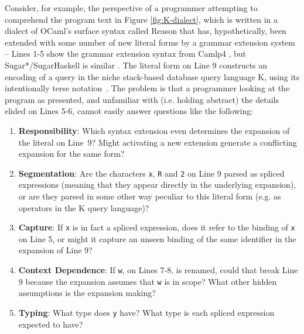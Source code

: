 \documentclass[acmsmall,review,anonymous]{acmart}\settopmatter{printfolios=true,printccs=false,printacmref=false}
\newcommand{\li}[1]{\lstinline[basicstyle=\ttfamily\fontsize{9pt}{1em}\selectfont]{#1}}
\begin{document}
Consider, for example, the perspective of a programmer attempting to comprehend the program text in Figure \ref{fig:K-dialect}, which is written in a dialect of OCaml's surface syntax called Reason \cite{reason-what} that has, hypothetically, been extended with some number of new literal forms by a grammar extension system -- Lines 1-5 show the grammar extension syntax from Camlp4 \cite{ocaml-manual}, but Sugar*/SugarHaskell is  similar \cite{erdweg2011sugarj,erdweg2013framework,erdweg2012layout}. 
The literal form on Line 9 constructs an encoding of a query in the niche stack-based database query language K, using its intentionally terse notation~\cite{Whitney:2001:LOR:376284.375783}. The problem is that a programmer looking at the program as presented, and unfamiliar with (i.e. holding abstract) the details elided on Lines 5-6, cannot easily answer questions like the following:

\begin{enumerate}[leftmargin=12px]
\item[\Circle] \textbf{Responsibility}: Which syntax extension even determines the expansion of the literal on Line~9? Might activating a new extension generate a conflicting expansion for the same form?
\item[\Circle] \textbf{Segmentation}: Are the characters \li{x}, \li{R} and \li{2} on Line 9 parsed as spliced expressions (meaning that they appear directly in the underlying expansion), or are they parsed in some other way peculiar to this literal form (e.g. as operators in the K query language)?
\item[\Circle] \textbf{Capture}: If \li{x} is in fact a spliced expression, does it refer to the binding of \li{x} on Line 5, or might it capture an unseen binding of the same identifier in the expansion of Line 9?
\item[\Circle] \textbf{Context Dependence}: If \li{w}, on Lines 7-8, is renamed, could that break Line 9  because the expansion assumes that \li{w} is in scope? What other hidden assumptions is the expansion making?
\item[\Circle] \textbf{Typing}: What type does \li{y} have? What type is each spliced expression expected to have?
\end{enumerate}
\end{document}
